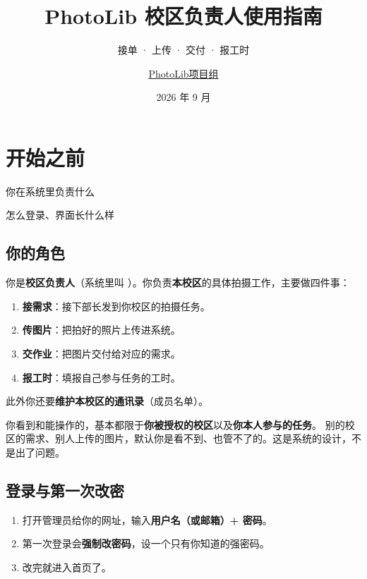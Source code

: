 \documentclass[cn,11pt,green]{elegantbook}
\title{PhotoLib 校区负责人使用指南}
\subtitle{接单 · 上传 · 交付 · 报工时}
\author{\href{mailto:i@liujr.uk}{PhotoLib项目组}}
\institute{校园摄影部图片工作站}
\date{2026 年 9 月}
\begin{document}
\maketitle
\frontmatter
\tableofcontents
\mainmatter

\chapter{开始之前}

\begin{introduction}
  \item 你在系统里负责什么
  \item 怎么登录、界面长什么样
\end{introduction}

\section{你的角色}

你是\textbf{校区负责人}（系统里叫 ）。你负责\textbf{本校区}的具体拍摄工作，主要做四件事：

\begin{enumerate}
  \item \textbf{接需求}：接下部长发到你校区的拍摄任务。
  \item \textbf{传图片}：把拍好的照片上传进系统。
  \item \textbf{交作业}：把图片交付给对应的需求。
  \item \textbf{报工时}：填报自己参与任务的工时。
\end{enumerate}

此外你还要\textbf{维护本校区的通讯录}（成员名单）。

\begin{notebox}[你只管自己的校区]
  你看到和能操作的，基本都限于\textbf{你被授权的校区}以及\textbf{你本人参与的任务}。
  别的校区的需求、别人上传的图片，默认你是看不到、也管不了的。这是系统的设计，不是出了问题。
\end{notebox}

\section{登录与第一次改密}

\begin{stepbox}[第一次登录]
  \begin{enumerate}
    \item 打开管理员给你的网址，输入\textbf{用户名（或邮箱）+ 密码}。
    \item 第一次登录会\textbf{强制改密码}，设一个只有你知道的强密码。
    \item 改完就进入首页了。
  \end{enumerate}
\end{stepbox}
\end{document}
